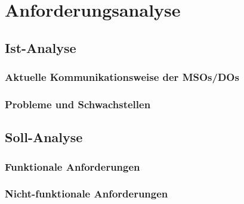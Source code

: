 \documentclass[11pt,a4paper]{article}
\begin{document}
\newpage

\section{Anforderungsanalyse}

\subsection{Ist-Analyse}

\subsubsection{Aktuelle Kommunikationsweise der MSOs/DOs}

\subsubsection{Probleme und Schwachstellen}

\subsection{Soll-Analyse}

\subsubsection{Funktionale Anforderungen}

\subsubsection{Nicht-funktionale Anforderungen}
\end{document}
